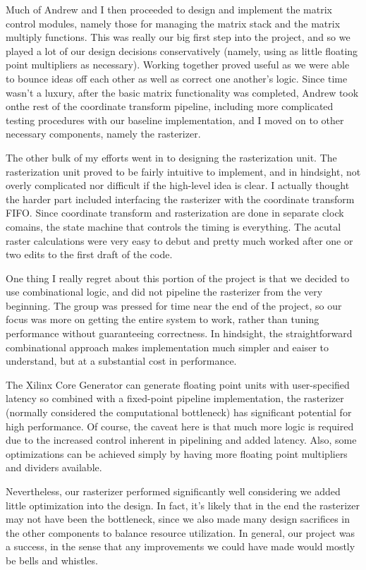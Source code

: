 \documentclass[letterpaper,10pt]{article}
\begin{document}
Much of  Andrew and I then proceeded to design and implement the matrix control modules, namely those for managing the matrix stack and the matrix multiply functions. This was really our big first step into the project, and so we played a lot of our design decisions conservatively (namely, using as little floating point multipliers as necessary). Working together proved useful as we were able to bounce ideas off each other as well as correct one another's logic. Since time wasn't a luxury, after the basic matrix functionality was completed, Andrew took onthe rest of the coordinate transform pipeline, including more complicated testing procedures with our baseline implementation, and I moved on to other necessary components, namely the rasterizer.

The other bulk of my efforts went in to designing the rasterization unit. The rasterization unit proved to be fairly intuitive to implement, and in hindsight, not overly complicated nor difficult if the high-level idea is clear. I actually thought the harder part included interfacing the rasterizer with the coordinate transform FIFO. Since coordinate transform and rasterization are done in separate clock comains, the state machine that controls the timing is everything. The acutal raster calculations were very easy to debut and pretty much worked after one or two edits to the first draft of the code. 

One thing I really regret about this portion of the project is that we decided to use combinational logic, and did not pipeline the rasterizer from the very beginning. The group was pressed for time near the end of the project, so our focus was more on getting the entire system to work, rather than tuning performance without guaranteeing correctness. In hindsight, the straightforward combinational approach makes implementation much simpler and eaiser to understand, but at a substantial cost in performance.  

The Xilinx Core Generator can generate floating point units with user-specified latency so combined with a fixed-point pipeline implementation, the rasterizer (normally considered the computational bottleneck) has significant potential for high performance. Of course, the caveat here is that much more logic is required due to the increased control inherent in pipelining and added latency. Also, some optimizations can be achieved simply by having more floating point multipliers and dividers available.

Nevertheless, our rasterizer performed significantly well considering we added little optimization into the design. In fact, it's likely that in the end the rasterizer may not have been the bottleneck, since we also made many design sacrifices in the other components to balance resource utilization. In general, our project was a success, in the sense that any improvements we could have made would mostly be bells and whistles. 
\end{document}
